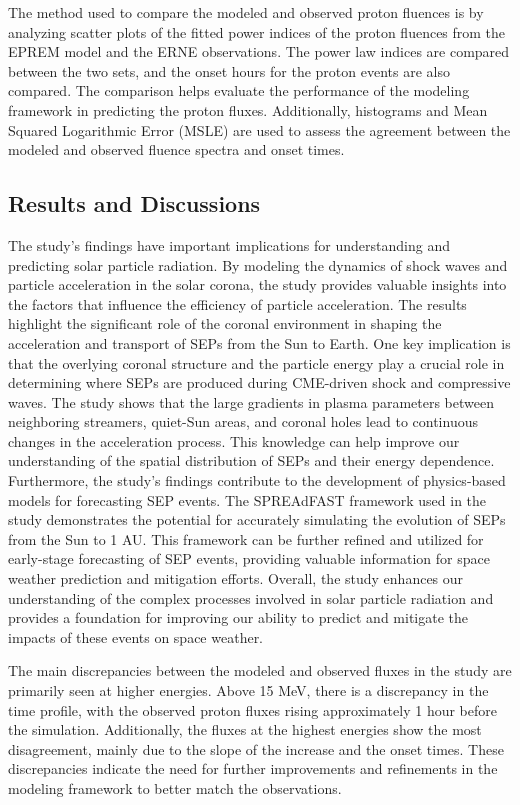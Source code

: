 The method used to compare the modeled and observed proton fluences is by analyzing scatter plots of the fitted power indices of the proton fluences from the EPREM model and the ERNE observations. The power law indices are compared between the two sets, and the onset hours for the proton events are also compared. The comparison helps evaluate the performance of the modeling framework in predicting the proton fluxes. Additionally, histograms and Mean Squared Logarithmic Error (MSLE) are used to assess the agreement between the modeled and observed fluence spectra and onset times.

\subsection{Results and Discussions}
The study's findings have important implications for understanding and predicting solar particle radiation. By modeling the dynamics of shock waves and particle acceleration in the solar corona, the study provides valuable insights into the factors that influence the efficiency of particle acceleration. The results highlight the significant role of the coronal environment in shaping the acceleration and transport of SEPs from the Sun to Earth. One key implication is that the overlying coronal structure and the particle energy play a crucial role in determining where SEPs are produced during CME-driven shock and compressive waves. The study shows that the large gradients in plasma parameters between neighboring streamers, quiet-Sun areas, and coronal holes lead to continuous changes in the acceleration process. This knowledge can help improve our understanding of the spatial distribution of SEPs and their energy dependence. Furthermore, the study's findings contribute to the development of physics-based models for forecasting SEP events. The SPREAdFAST framework used in the study demonstrates the potential for accurately simulating the evolution of SEPs from the Sun to 1 AU. This framework can be further refined and utilized for early-stage forecasting of SEP events, providing valuable information for space weather prediction and mitigation efforts. Overall, the study enhances our understanding of the complex processes involved in solar particle radiation and provides a foundation for improving our ability to predict and mitigate the impacts of these events on space weather.

The main discrepancies between the modeled and observed fluxes in the study are primarily seen at higher energies. Above 15 MeV, there is a discrepancy in the time profile, with the observed proton fluxes rising approximately 1 hour before the simulation. Additionally, the fluxes at the highest energies show the most disagreement, mainly due to the slope of the increase and the onset times. These discrepancies indicate the need for further improvements and refinements in the modeling framework to better match the observations.

